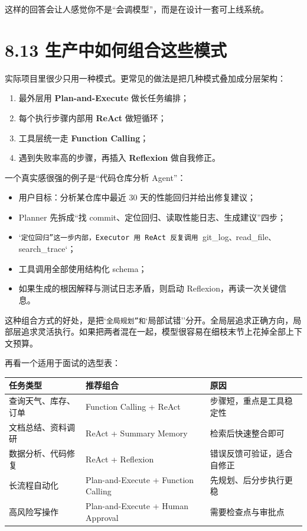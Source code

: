 这样的回答会让人感觉你不是``会调模型''，而是在设计一套可上线系统。


\section{8.13 生产中如何组合这些模式}

实际项目里很少只用一种模式。更常见的做法是把几种模式叠加成分层架构：


\begin{enumerate}[leftmargin=2em]
\item 最外层用 \textbf{Plan-and-Execute} 做长任务编排；
\item 每个执行步骤内部用 \textbf{ReAct} 做短循环；
\item 工具层统一走 \textbf{Function Calling}；
\item 遇到失败率高的步骤，再插入 \textbf{Reflexion} 做自我修正。
\end{enumerate}

一个真实感很强的例子是``代码仓库分析 Agent''：


\begin{itemize}[leftmargin=2em]
\item 用户目标：分析某仓库中最近 30 天的性能回归并给出修复建议；
\item Planner 先拆成``找 commit、定位回归、读取性能日志、生成建议''四步；
\item `\texttt{定位回归''这一步内部，Executor 用 ReAct 反复调用 }git\_log\texttt{、}read\_file\texttt{、}search\_trace`；
\item 工具调用全部使用结构化 schema；
\item 如果生成的根因解释与测试日志矛盾，则启动 Reflexion，再读一次关键信息。
\end{itemize}

这种组合方式的好处，是把`\texttt{全局规划''和}`局部试错''分开。全局层追求正确方向，局部层追求灵活执行。如果把两者混在一起，模型很容易在细枝末节上花掉全部上下文预算。


再看一个适用于面试的选型表：


\begingroup
\scriptsize
\setlength{\tabcolsep}{3pt}
\begin{longtable}{|p{}|p{}|p{}|}
\hline
任务类型 & 推荐组合 & 原因 \\ \hline
查询天气、库存、订单 & Function Calling + ReAct & 步骤短，重点是工具稳定性 \\ \hline
文档总结、资料调研 & ReAct + Summary Memory & 检索后快速整合即可 \\ \hline
数据分析、代码修复 & ReAct + Reflexion & 错误反馈可验证，适合自修正 \\ \hline
长流程自动化 & Plan-and-Execute + Function Calling & 先规划、后分步执行更稳 \\ \hline
高风险写操作 & Plan-and-Execute + Human Approval & 需要检查点与审批点 \\ \hline
\end{longtable}
\endgroup

